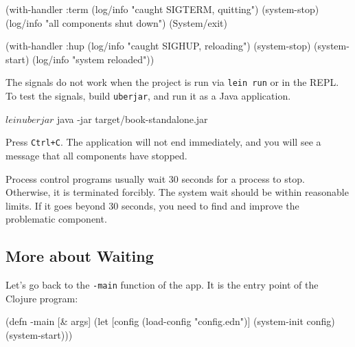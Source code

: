 \begin{english}
  \begin{clojure}
(with-handler :term
  (log/info "caught SIGTERM, quitting")
  (system-stop)
  (log/info "all components shut down")
  (System/exit)
  \end{clojure}
\end{english}


\begin{english}
  \begin{clojure}
(with-handler :hup
  (log/info "caught SIGHUP, reloading")
  (system-stop)
  (system-start)
  (log/info "system reloaded"))
  \end{clojure}
\end{english}

The signals do not work when the project is run via \verb|lein run| or in the REPL. To test the signals, build \verb|uberjar|, and run it as a Java application.

\begin{english}
  \begin{bash}
$ lein uberjar
$ java -jar target/book-standalone.jar
  \end{bash}
\end{english}

Press \verb|Ctrl+C|. The application will not end immediately, and you will see a message that all components have stopped.

Process control programs usually wait 30 seconds for a process to stop. Otherwise, it is terminated forcibly. The system wait should be within reasonable limits. If it goes beyond 30 seconds, you need to find and improve the problematic component.

\subsection{More about Waiting}


Let's go back to the \verb|-main| function of the app. It is the entry point of the Clojure program:

\ifnarrow

\begin{english}
  \begin{clojure}
(defn -main [& args]
  (let [config
        (load-config "config.edn")]
    (system-init config)
    (system-start)))
  \end{clojure}
\end{english}

